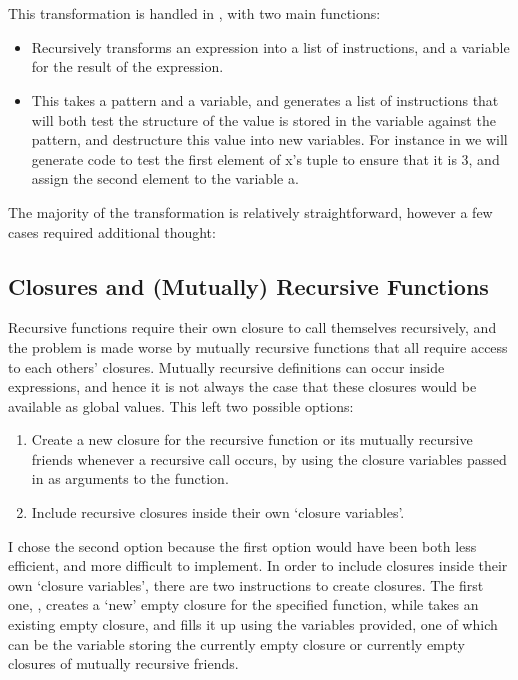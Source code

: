 \\\\
This transformation is handled in , with two main functions:
\begin{itemize}
\item {} Recursively transforms an expression into a list of instructions, and a variable for the result of the expression.
\item {} This takes a pattern and a variable, and generates a list of instructions that will both test the structure of the value is stored in the variable against the pattern, and destructure this value into new variables. For instance in  we will generate code to test the first element of x's tuple to ensure that it is 3, and assign the second element to the variable a.
\end{itemize}
The majority of the transformation is relatively straightforward, however a few cases required additional thought:

\subsection{Closures and (Mutually) Recursive Functions}
Recursive functions require their own closure to call themselves recursively, and the problem is made worse by mutually recursive functions that all require access to each others' closures. Mutually recursive definitions can occur inside expressions, and hence it is not always the case that these closures would be available as global values. This left two possible options:
\begin{enumerate}
\item Create a new closure for the recursive function or its mutually recursive friends whenever a recursive call occurs, by using the closure variables passed in as arguments to the function.
\item Include recursive closures inside their own `closure variables'.
\end{enumerate}
I chose the second option because the first option would have been both less efficient, and more difficult to implement. In order to include closures inside their own `closure variables', there are two instructions to create closures. The first one, , creates a `new' empty closure for the specified function, while  takes an existing empty closure, and fills it up using the variables provided, one of which can be the variable storing the currently empty closure or currently empty closures of mutually recursive friends.

